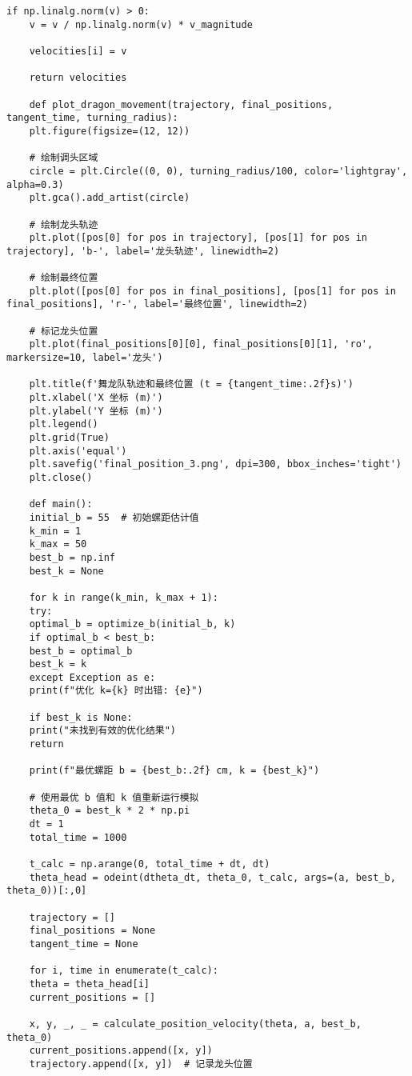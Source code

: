 \begin{lstlisting}[caption={问题三处理代码1}]
	if np.linalg.norm(v) > 0:
	v = v / np.linalg.norm(v) * v_magnitude
	
	velocities[i] = v
	
	return velocities
	
	def plot_dragon_movement(trajectory, final_positions, tangent_time, turning_radius):
	plt.figure(figsize=(12, 12))
	
	# 绘制调头区域
	circle = plt.Circle((0, 0), turning_radius/100, color='lightgray', alpha=0.3)
	plt.gca().add_artist(circle)
	
	# 绘制龙头轨迹
	plt.plot([pos[0] for pos in trajectory], [pos[1] for pos in trajectory], 'b-', label='龙头轨迹', linewidth=2)
	
	# 绘制最终位置
	plt.plot([pos[0] for pos in final_positions], [pos[1] for pos in final_positions], 'r-', label='最终位置', linewidth=2)
	
	# 标记龙头位置
	plt.plot(final_positions[0][0], final_positions[0][1], 'ro', markersize=10, label='龙头')
	
	plt.title(f'舞龙队轨迹和最终位置 (t = {tangent_time:.2f}s)')
	plt.xlabel('X 坐标 (m)')
	plt.ylabel('Y 坐标 (m)')
	plt.legend()
	plt.grid(True)
	plt.axis('equal')
	plt.savefig('final_position_3.png', dpi=300, bbox_inches='tight')
	plt.close()
	
	def main():
	initial_b = 55  # 初始螺距估计值
	k_min = 1
	k_max = 50
	best_b = np.inf
	best_k = None
	
	for k in range(k_min, k_max + 1):
	try:
	optimal_b = optimize_b(initial_b, k)
	if optimal_b < best_b:
	best_b = optimal_b
	best_k = k
	except Exception as e:
	print(f"优化 k={k} 时出错: {e}")
	
	if best_k is None:
	print("未找到有效的优化结果")
	return
	
	print(f"最优螺距 b = {best_b:.2f} cm, k = {best_k}")
	
	# 使用最优 b 值和 k 值重新运行模拟
	theta_0 = best_k * 2 * np.pi
	dt = 1
	total_time = 1000
	
	t_calc = np.arange(0, total_time + dt, dt)
	theta_head = odeint(dtheta_dt, theta_0, t_calc, args=(a, best_b, theta_0))[:,0]
	
	trajectory = []
	final_positions = None
	tangent_time = None
	
	for i, time in enumerate(t_calc):
	theta = theta_head[i]
	current_positions = []
	
	x, y, _, _ = calculate_position_velocity(theta, a, best_b, theta_0)
	current_positions.append([x, y])
	trajectory.append([x, y])  # 记录龙头位置
	

\end{lstlisting}
